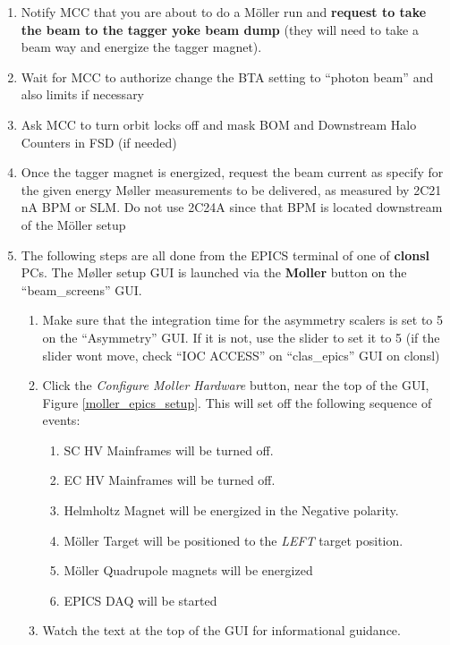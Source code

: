 \begin{enumerate}
\item Notify MCC that you are about to do a M{\"o}ller run and \textbf{request
to take the beam to the tagger yoke beam dump} (they will need to take a beam
way and energize the tagger magnet). 
\item Wait for MCC to authorize change the BTA setting to ``photon
beam'' and also limits if necessary 
\item Ask MCC to turn orbit locks off and mask BOM and Downstream Halo
  Counters in FSD (if needed)
\item Once the tagger magnet is energized, request the beam current as specify for the given energy M{\o}ller measurements to be delivered, as measured by 2C21 nA BPM or SLM. Do
not use 2C24A since that BPM is located downstream of the M{\"o}ller setup
\item The following steps are all done from the EPICS terminal of one of \textbf{clonsl} PCs. The
M{\o}ller setup GUI is launched via the \textbf{Moller} button on the {}``beam\_screens'' GUI. 

\begin{enumerate}
\item Make sure that the integration time for the asymmetry scalers is
set to 5 on the ``Asymmetry'' GUI. If it is not, use the slider to
set it to 5 (if the slider wont move, check ``IOC ACCESS'' on
``clas\_epics'' GUI on clonsl) 
 
\item Click the \emph{Configure Moller Hardware} button, near the top of
the GUI, Figure \ref{moller_epics_setup}. This will set off the following sequence of events:

\begin{enumerate}
\item SC HV Mainframes will be turned off.
\item EC HV Mainframes will be turned off.
\item Helmholtz Magnet will be energized in the Negative polarity.
\item M{\"o}ller Target will be positioned to the \emph{LEFT} target position.
\item M{\"o}ller Quadrupole magnets will be energized
\item EPICS DAQ will be started
\end{enumerate}
\item Watch the text at the top of the GUI for informational guidance.
\end{enumerate}
\end{enumerate}
%

